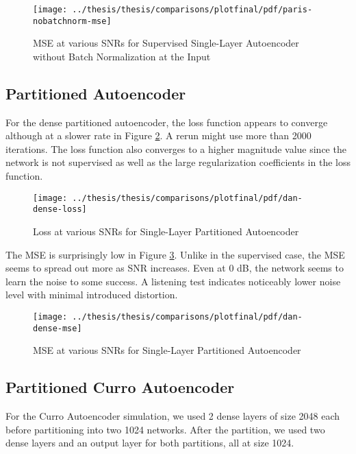 \begin{figure}[!ht]
\centering
\texttt{[image: ../thesis/thesis/comparisons/plotfinal/pdf/paris-nobatchnorm-mse]}
\caption{MSE at various SNRs for Supervised Single-Layer Autoencoder without Batch Normalization at the Input}\label{fig:paris-mse}
\end{figure}


\subsection{Partitioned Autoencoder}

For the dense partitioned autoencoder, the loss function appears to converge although at a slower rate in Figure \ref{fig:dan-loss}. A rerun might use more than 2000 iterations. The loss function also converges to a higher magnitude value since the network is not supervised as well as the large regularization coefficients in the loss function.

\begin{figure}[!ht]
\centering
\texttt{[image: ../thesis/thesis/comparisons/plotfinal/pdf/dan-dense-loss]}
\caption{Loss at various SNRs for Single-Layer Partitioned Autoencoder\cite{stow}}
\label{fig:dan-loss}
\end{figure}

The MSE is surprisingly low in Figure \ref{fig:dan-mse}. Unlike in the supervised case, the MSE seems to spread out more as SNR increases. Even at 0 dB, the network seems to learn the noise to some success. A listening test indicates noticeably lower noise level with minimal introduced distortion.

\begin{figure}[!ht]
\centering
\texttt{[image: ../thesis/thesis/comparisons/plotfinal/pdf/dan-dense-mse]}
\caption{MSE at various SNRs for Single-Layer Partitioned Autoencoder\cite{stow}}
\label{fig:dan-mse}
\end{figure}

\subsection{Partitioned Curro Autoencoder}

For the Curro Autoencoder simulation, we used 2 dense layers of size 2048 each before partitioning into two 1024 networks. After the partition, we used two dense layers and an output layer for both partitions, all at size 1024.

